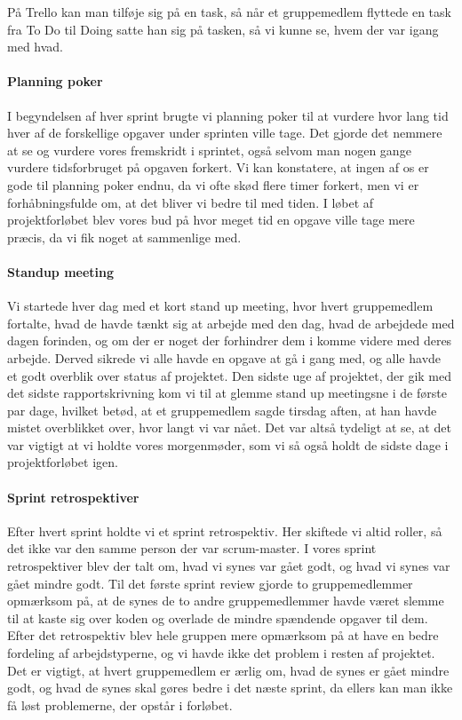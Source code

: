 På Trello kan man tilføje sig på en task, så når et gruppemedlem flyttede en task fra To Do til Doing satte han sig på tasken, så vi kunne se, hvem der var igang med hvad.

\paragraph*{Planning poker}
I begyndelsen af hver sprint brugte vi planning poker til at vurdere hvor lang tid hver af de forskellige opgaver under sprinten ville tage.
Det gjorde det nemmere at se og vurdere vores fremskridt i sprintet, også selvom man nogen gange vurdere tidsforbruget på opgaven forkert.
Vi kan konstatere, at ingen af os er gode til planning poker endnu, da vi ofte skød flere timer forkert, men vi er forhåbningsfulde om, at det bliver vi bedre til med tiden.
I løbet af projektforløbet blev vores bud på hvor meget tid en opgave ville tage mere præcis, da vi fik noget at sammenlige med.

\paragraph*{Standup meeting}
Vi startede hver dag med et kort stand up meeting, hvor hvert gruppemedlem fortalte, hvad de havde tænkt sig at arbejde med den dag, hvad de arbejdede med dagen forinden, og om der er noget der forhindrer dem i komme videre med deres arbejde.
Derved sikrede vi alle havde en opgave at gå i gang med, og alle havde et godt overblik over status af projektet.
Den sidste uge af projektet, der gik med det sidste rapportskrivning kom vi til at glemme stand up meetingsne i de første par dage, hvilket betød, at et gruppemedlem sagde tirsdag aften, at han havde mistet overblikket over, hvor langt vi var nået.
Det var altså tydeligt at se, at det var vigtigt at vi holdte vores morgenmøder, som vi så også holdt de sidste dage i projektforløbet igen.

\paragraph*{Sprint retrospektiver}
Efter hvert sprint holdte vi et sprint retrospektiv. Her skiftede vi altid roller, så det ikke var den samme person der var scrum-master.
I vores sprint retrospektiver blev der talt om, hvad vi synes var gået godt, og hvad vi synes var gået mindre godt.
Til det første sprint review gjorde to gruppemedlemmer opmærksom på, at de synes de to andre gruppemedlemmer havde været slemme til at kaste sig over koden og overlade de mindre spændende opgaver til dem.
Efter det retrospektiv blev hele gruppen mere opmærksom på at have en bedre fordeling af arbejdstyperne, og vi havde ikke det problem i resten af projektet.
Det er vigtigt, at hvert gruppemedlem er ærlig om, hvad de synes er gået mindre godt, og hvad de synes skal gøres bedre i det næste sprint, da ellers kan man ikke få løst problemerne, der opstår i forløbet.


